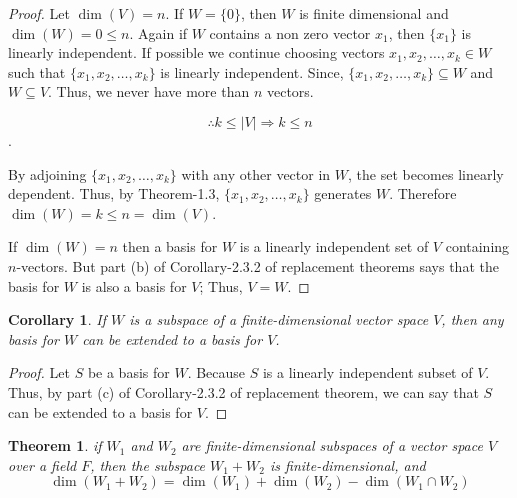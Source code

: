 \documentclass[12pt, a4paper]{article}
\newtheorem{theorem}{Theorem}[section]
\newtheorem{corollary}{Corollary}[theorem]
\theoremstyle{definition}
\theoremstyle{remark}
\begin{document}
\begin{proof}
    Let $\dim(V) = n$. If $W = \{0\}$, then $W$ is finite dimensional and $\dim(W) = 0 \leq n$. Again if $W$ contains a non zero vector $x_1$, then $\{x_1\}$ is linearly independent. If possible we continue choosing vectors $x_1, x_2, \dots, x_k \in W$ such that $\{x_1, x_2, \dots, x_k\}$ is linearly independent. Since, $\{x_1, x_2, \dots, x_k\} \subseteq W$ and $W \subseteq V$. Thus, we never have more than $n$ vectors.

$$\therefore k \leq |V| \Rightarrow k \leq n$$.

By adjoining $\{x_1, x_2, \dots, x_k\}$ with any other vector in $W$, the set becomes linearly dependent. Thus, by Theorem-1.3, $\{x_1, x_2, \dots, x_k\}$ generates $W$. Therefore $\dim(W) = k \leq n = \dim(V)$.

If $\dim(W) = n$ then a basis for $W$ is a linearly independent set of $V$ containing $n$-vectors. But part (b) of Corollary-2.3.2 of replacement theorems says that the basis for $W$ is also a basis for $V$; Thus, $V = W$.
\end{proof}

\begin{corollary}
    If $W$ is a subspace of a finite-dimensional vector space $V$, then any basis for $W$ can be extended to a basis for $V$.
\end{corollary}

\begin{proof}
    Let $S$ be a basis for $W$. Because $S$ is a linearly independent subset of $V$. Thus, by part (c) of Corollary-2.3.2 of replacement theorem, we can say that $S$ can be extended to a basis for $V$.
\end{proof}

\begin{theorem}
    if $W_1$ and $W_2$ are finite-dimensional subspaces of a vector space $V$ over a field $F$, then the subspace $W_1 + W_2$ is finite-dimensional, and 
    \[\dim(W_1+W_2) = \dim(W_1) + \dim(W_2) - \dim(W_1 \cap W_2)\]
\end{theorem}
\end{document}
